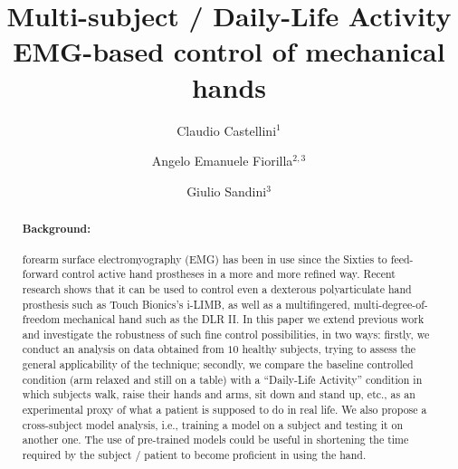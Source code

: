 \documentclass[10pt]{bmc_article}
\newenvironment{bmcformat}{\begin{raggedright}\baselineskip20pt\sloppy\setboolean{publ}{false}}{\end{raggedright}\baselineskip20pt\sloppy}
\begin{document}
\begin{bmcformat}

\title{Multi-subject / Daily-Life Activity\\EMG-based control of mechanical hands}
 
\author{%
  Claudio Castellini\correspondingauthor$^1$%
\and
  Angelo Emanuele Fiorilla$^{2,3}$%
\and
  Giulio Sandini$^3$%
}%

\address{%
    \iid(1)LIRA-Lab, University of Genova, viale F. Causa 13, 16145 Genova, Italy\\
    \iid(2)DIST, University of Genova, viale F. Causa 13, 16145 Genova, Italy\\
    \iid(3)Italian Institute of Technology, via Morego 30, 16163 Genova, Italy
}%

\maketitle

\begin{abstract}

\paragraph*{Background:}

forearm surface electromyography (EMG) has been in use since the Sixties
to feed-forward control active hand prostheses in a more and more refined way.
Recent research shows that it can be used to control even a dexterous
polyarticulate hand prosthesis such as Touch Bionics's i-LIMB,
as well as a multifingered, multi-degree-of-freedom mechanical hand such
as the DLR II. In this paper we extend previous work and investigate
the robustness of such fine control possibilities, in two ways: firstly,
we conduct an analysis on data obtained from $10$ healthy subjects, trying
to assess the general applicability of the technique; secondly, we compare
the baseline controlled condition (arm relaxed and still on a table) with
a ``Daily-Life Activity'' condition in which subjects walk, raise
their hands and arms, sit down and stand up, etc., as an experimental proxy
of what a patient is supposed to do in real life.
We also propose a cross-subject model analysis,
i.e., training a model on a subject and testing it on another one. The use
of pre-trained models could be useful in shortening the time required by
the subject / patient to become proficient in using the hand.


\end{abstract}
\end{bmcformat}
\end{document}
